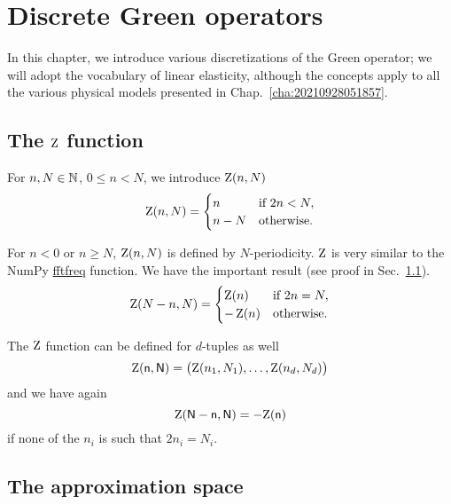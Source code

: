 \chapter{Discrete Green operators}

In this chapter, we introduce various discretizations of the Green operator; we
will adopt the vocabulary of linear elasticity, although the concepts apply to
all the various physical models presented in Chap.~\ref{cha:20210928051857}.

\section{The \(\operatorname{Z}\) function}

For \(n, N\in\mathbb N\), \(0\leq n<N\), we introduce \(\operatorname{Z}(n, N)\)
\begin{equation}
  \operatorname{Z}(n, N)=
  \begin{cases}
    n & \text{if }2n<N,\\
    n-N & \text{otherwise.}
  \end{cases}
\end{equation}

For \(n<0\) or \(n\geq N\), \(\operatorname{Z}(n, N)\) is defined by
\(N\)-periodicity. \(\operatorname{Z}\) is very similar to the NumPy
\href{https://numpy.org/doc/1.18/reference/generated/numpy.fft.fftfreq.html#numpy.fft.fftfreq}{fftfreq}
function. We have the important result (see proof in Sec.~\ref{}).
\begin{equation}
  \operatorname{Z}(N-n, N)=
  \begin{cases}
    \operatorname{Z}(n) & \text{if }2n=N,\\
    -\operatorname{Z}(n) & \text{otherwise.}
  \end{cases}
\end{equation}

The \(\operatorname{Z}\) function can be defined for \(d\)-tuples as well
\begin{equation}
  \mathsf {\operatorname{Z}}(\mathsf n, \mathsf N)
  =\bigl(\operatorname{Z}(n_1, N_1), \ldots, \operatorname{Z}(n_d, N_d)\bigr)
\end{equation}
and we have again
\begin{equation}
  \mathsf {\operatorname{Z}}(\mathsf N-\mathsf n, \mathsf N)=-\mathsf {\operatorname{Z}}(\mathsf n)
\end{equation}
if none of the \(n_i\) is such that \(2n_i=N_i\).

\section{The approximation space}
\label{sec:20210928054031}

